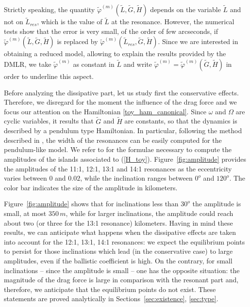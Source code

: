\documentclass[12pt,reqno]{amsart}
\numberwithin{equation}{section}
\newcommand\equ[1]{{\rm (\ref{#1})}}
\begin{document}
Strictly speaking, the quantity $\widetilde{\varphi}^{(m)}(\widetilde{L}, \widetilde{G}, \widetilde{H})$
depends on the variable $\widetilde{L}$ and not on $\widetilde{L}_{res}$, which is the
value of $\widetilde{L}$ at the resonance. However, the numerical tests show that the error is very small,
of the order of few arcseconds, if $\widetilde{\varphi}^{(m)}(\widetilde{L}, \widetilde{G}, \widetilde{H})$
is replaced by $\widetilde{\varphi}^{(m)} (\widetilde{L}_{res},\widetilde{G},\widetilde{H})$.
Since we are interested in obtaining a reduced model, allowing to explain the results provided by the DMLR,
we take $\widetilde{\varphi}^{(m)}$ as constant in $\widetilde{L}$ and write  $\widetilde{\varphi}^{(m)}=\widetilde{\varphi}^{(m)}(\widetilde{G}, \widetilde{H})$ in order to underline this aspect.

Before analyzing the dissipative part, let us study first the conservative effects. Therefore, we disregard for the moment the influence of the drag force and we focus our attention on  the Hamiltonian \eqref{toy_ham_canonical}.
Since $\omega$ and $\Omega$ are cyclic variables,
it results that $\widetilde{G}$ and $\widetilde{H}$ are constants, so that
the dynamics is described by a pendulum type Hamiltonian. In particular, following the method described
in \cite{CGmajor}, the width of the resonances can be easily computed for the pendulum-like model.
We refer to \cite{CGminor} for the formulae necessary to compute the amplitudes of the islands
associated to \equ{H_toy}.
Figure~\ref{fig:amplitude} provides the amplitudes of the 11:1, 12:1, 13:1 and 14:1 resonances as the eccentricity varies
between $0$ and $0.02$, while the inclination ranges between $0^o$ and $120^o$. The color bar indicates the size of the amplitude in kilometers.

Figure~\ref{fig:amplitude} shows that for inclinations less than $30^o$ the amplitude is small, at most $350\, m$,  while for larger inclinations, the amplitude could reach about two (or three for the 13:1 resonance) kilometers.
Having in mind these results, we can anticipate what happens when the dissipative effects
are taken into account for the 12:1, 13:1, 14:1 resonances: we expect the equilibrium points to persist for those inclinations which lead (in the conservative case) to large amplitudes,
even if the ballistic coefficient is high. On the contrary, for small inclinations -- since the amplitude is small --  one has the opposite situation:
the magnitude of the drag force is large in comparison with the resonant part and, therefore,
we anticipate that the equilibrium points do not exist. These statements are proved analytically in
Sections~\ref{sec:existence}, \ref{sec:type}.
\end{document}

